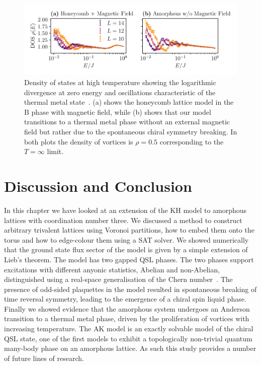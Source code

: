 \hypertarget{fig:DOS_oscillations}{%
\begin{figure}
\centering
\includegraphics[width=1\textwidth,height=\textheight]{figure_code/amk_chapter/results/DOS_oscillations/DOS_oscillations}
\caption[{Distinctive Oscillations in the Density of States}]{Density of states at high temperature showing the logarithmic divergence at zero energy and oscillations characteristic of the thermal metal state~\autocite{bocquet_disordered_2000,selfThermallyInducedMetallic2019}. (a) shows the honeycomb lattice model in the B phase with magnetic field, while (b) shows that our model transitions to a thermal metal phase without an external magnetic field but rather due to the spontaneous chiral symmetry breaking. In both plots the density of vortices is \(\rho = 0.5\) corresponding to the \(T = \infty\) limit.}
\label{fig:DOS_oscillations}
\end{figure}
}

\hypertarget{sec:AMK-Conclusion}{%
\section{Discussion and Conclusion}\label{sec:AMK-Conclusion}}

In this chapter we have looked at an extension of the KH model to amorphous lattices with coordination number three. We discussed a method to construct arbitrary trivalent lattices using Voronoi partitions, how to embed them onto the torus and how to edge-colour them using a SAT solver. We showed numerically that the ground state flux sector of the model is given by a simple extension of Lieb's theorem. The model has two gapped QSL phases. The two phases support excitations with different anyonic statistics, Abelian and non-Abelian, distinguished using a real-space generalisation of the Chern number~\autocite{peru_preprint}. The presence of odd-sided plaquettes in the model resulted in spontaneous breaking of time reversal symmetry, leading to the emergence of a chiral spin liquid phase. Finally we showed evidence that the amorphous system undergoes an Anderson transition to a thermal metal phase, driven by the proliferation of vortices with increasing temperature. The AK model is an exactly solvable model of the chiral QSL state, one of the first models to exhibit a topologically non-trivial quantum many-body phase on an amorphous lattice. As such this study provides a number of future lines of research.


